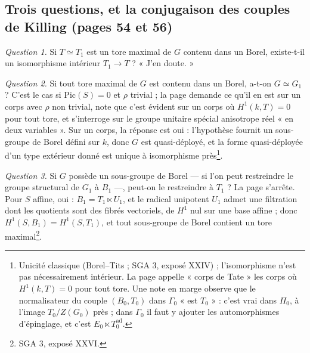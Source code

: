 \documentclass[11pt,a4paper]{article}
\begin{document}
\subsection*{Trois questions, et la conjugaison des couples de Killing (pages 54 et 56)}

\emph{Question 1.} Si $T \simeq T_1$ est un tore maximal de $G$ contenu dans un
Borel, existe-t-il un isomorphisme intérieur $T_1 \to T$ ? « J'en doute. »

\emph{Question 2.} Si tout tore maximal de $G$ est contenu dans un Borel, a-t-on
$G \simeq G_1$ ? C'est le cas si $\mathrm{Pic}(S) = 0$ et $\rho$ trivial ; la page
demande ce qu'il en est sur un corps avec $\rho$ non trivial, note que c'est
évident sur un corps où $H^1(k,T) = 0$ pour tout tore, et s'interroge sur le
groupe unitaire spécial anisotrope réel « en deux variables ». Sur un corps,
la réponse est oui : l'hypothèse fournit
un sous-groupe de Borel défini sur $k$, donc $G$ est quasi-déployé, et la forme
quasi-déployée d'un type extérieur donné est unique à isomorphisme
près\footnote{Unicité classique (Borel--Tits ; SGA 3, exposé XXIV) ;
l'isomorphisme n'est pas nécessairement intérieur. La page appelle « corps de
Tate » les corps où $H^1(k,T) = 0$ pour tout tore. Une note en marge observe
que le normalisateur du couple $(B_0, T_0)$ dans $\Gamma_0$ « est $T_0$ » : c'est
vrai dans $\Pi_0$, à l'image $T_0/Z(G_0)$ près ; dans $\Gamma_0$ il faut y ajouter
les automorphismes d'épinglage, et c'est $E_0 \ltimes T_0^{\mathrm{ad}}$.}.

\emph{Question 3.} Si $G$ possède un sous-groupe de Borel — si l'on peut
restreindre le groupe structural de $G_1$ à $B_1$ —, peut-on le restreindre à
$T_1$ ? La page s'arrête. Pour $S$ affine, oui : $B_1 = T_1 \ltimes U_1$, et le
radical unipotent $U_1$ admet une filtration dont les quotients sont des fibrés
vectoriels, de $H^1$ nul sur une base affine ; donc $H^1(S,B_1) = H^1(S,T_1)$, et
tout sous-groupe de Borel contient un tore maximal\footnote{SGA 3, exposé XXVI.}.
\end{document}
